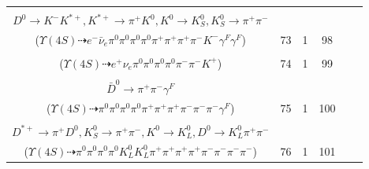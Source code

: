 \documentclass[landscape]{article}
\newcounter{rownumbers}
\newcommand\rn{\stepcounter{rownumbers}\arabic{rownumbers}}
\newcommand{\EOLP}{\\ \hline} %
\newcommand{\topoTags}[1]{#1} %
\begin{document}
\begin{longtable}{clcccc}
\rn & \makecell[l]{ $ 
\Upsilon(4S) \rightarrow B^{0} \bar{B}^{0} ,
B^{0} \rightarrow \pi^{0} \bar{D}^{0} ,
\bar{B}^{0} \rightarrow e^{-} \bar{\nu}_{e} D_{2}^{*+} \gamma^{F} \gamma^{F} ,
\bar{D}^{0} \rightarrow \pi^{0} \pi^{0} ,
D_{2}^{*+} \rightarrow \pi^{+} D^{*0} ,
D^{*0} \rightarrow \pi^{0} D^{0} ,
$ \\ $
D^{0} \rightarrow K^{-} K^{*+} ,
K^{*+} \rightarrow \pi^{+} K^{0} ,
K^{0} \rightarrow K_{S}^{0} ,
K_{S}^{0} \rightarrow \pi^{+} \pi^{-} 
$ \\ ($
\Upsilon(4S) \dashrightarrow e^{-} \bar{\nu}_{e} \pi^{0} \pi^{0} \pi^{0} \pi^{0} \pi^{+} \pi^{+} \pi^{+} \pi^{-} K^{-} \gamma^{F} \gamma^{F} 
$) } & \topoTags{73 & }1 & 98 \EOLP

\rn & \makecell[l]{ $ 
\Upsilon(4S) \rightarrow B^{0} \bar{B}^{0} ,
B^{0} \rightarrow e^{+} \nu_{e} D^{*-} ,
\bar{B}^{0} \rightarrow \pi^{0} D^{0} ,
D^{*-} \rightarrow \pi^{0} D^{-} ,
D^{0} \rightarrow \pi^{0} \pi^{0} ,
D^{-} \rightarrow \pi^{-} \pi^{-} K^{+} 
$ \\ ($
\Upsilon(4S) \dashrightarrow e^{+} \nu_{e} \pi^{0} \pi^{0} \pi^{0} \pi^{0} \pi^{-} \pi^{-} K^{+} 
$) } & \topoTags{74 & }1 & 99 \EOLP

\rn & \makecell[l]{ $ 
\Upsilon(4S) \rightarrow B^{0} B^{0} ,
B^{0} \rightarrow \pi^{0} \bar{D}^{0} ,
B^{0} \rightarrow \pi^{+} \omega D^{*-} ,
\bar{D}^{0} \rightarrow \pi^{0} \pi^{0} ,
\omega \rightarrow \pi^{0} \pi^{+} \pi^{-} ,
D^{*-} \rightarrow \pi^{-} \bar{D}^{0} ,
$ \\ $
\bar{D}^{0} \rightarrow \pi^{+} \pi^{-} \gamma^{F} 
$ \\ ($
\Upsilon(4S) \dashrightarrow \pi^{0} \pi^{0} \pi^{0} \pi^{0} \pi^{+} \pi^{+} \pi^{+} \pi^{-} \pi^{-} \pi^{-} \gamma^{F} 
$) } & \topoTags{75 & }1 & 100 \EOLP

\rn & \makecell[l]{ $ 
\Upsilon(4S) \rightarrow B^{0} \bar{B}^{0} ,
B^{0} \rightarrow \pi^{0} \bar{D}^{0} ,
\bar{B}^{0} \rightarrow \pi^{0} \pi^{-} \pi^{-} \bar{K}^{0} K^{*+} D^{*+} ,
\bar{D}^{0} \rightarrow \pi^{0} \pi^{0} ,
\bar{K}^{0} \rightarrow K_{S}^{0} ,
K^{*+} \rightarrow \pi^{+} K^{0} ,
$ \\ $
D^{*+} \rightarrow \pi^{+} D^{0} ,
K_{S}^{0} \rightarrow \pi^{+} \pi^{-} ,
K^{0} \rightarrow K_{L}^{0} ,
D^{0} \rightarrow K_{L}^{0} \pi^{+} \pi^{-} 
$ \\ ($
\Upsilon(4S) \dashrightarrow \pi^{0} \pi^{0} \pi^{0} \pi^{0} K_{L}^{0} K_{L}^{0} \pi^{+} \pi^{+} \pi^{+} \pi^{+} \pi^{-} \pi^{-} \pi^{-} \pi^{-} 
$) } & \topoTags{76 & }1 & 101 \EOLP


\end{longtable}
\end{document}
